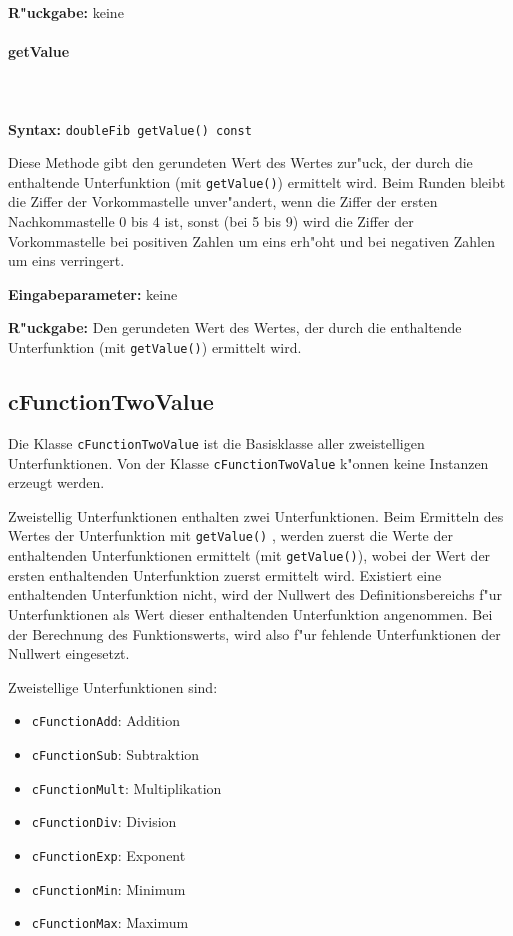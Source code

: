 \bigskip\noindent
\textbf{R"uckgabe:} keine


\paragraph{getValue}

\ \\\\\noindent
\textbf{Syntax:} \verb|doubleFib getValue() const|

\bigskip\noindent
Diese Methode gibt den gerundeten Wert des Wertes zur"uck, der durch die enthaltende Unterfunktion (mit \verb|getValue()|) ermittelt wird. Beim Runden bleibt die Ziffer der Vorkommastelle unver"andert, wenn die Ziffer der ersten Nachkommastelle 0 bis 4 ist, sonst (bei 5 bis 9) wird die Ziffer der Vorkommastelle bei positiven Zahlen um eins erh"oht und bei negativen Zahlen um eins verringert.

\bigskip\noindent
\textbf{Eingabeparameter:} keine

\bigskip\noindent
\textbf{R"uckgabe:} Den gerundeten Wert des Wertes, der durch die enthaltende Unterfunktion (mit \verb|getValue()|) ermittelt wird.




\subsection{cFunctionTwoValue}

Die Klasse \verb|cFunctionTwoValue| ist die Basisklasse aller zweistelligen Unterfunktionen. Von der Klasse \verb|cFunctionTwoValue| k"onnen keine Instanzen erzeugt werden.

Zweistellig Unterfunktionen enthalten zwei Unterfunktionen. Beim Ermitteln des Wertes der Unterfunktion mit \verb|getValue()| , werden zuerst die Werte der enthaltenden Unterfunktionen ermittelt (mit \verb|getValue()|), wobei der Wert der ersten enthaltenden Unterfunktion zuerst ermittelt wird. Existiert eine enthaltenden Unterfunktion nicht, wird der Nullwert des Definitionsbereichs f"ur Unterfunktionen als Wert dieser enthaltenden Unterfunktion angenommen. Bei der Berechnung des Funktionswerts, wird also f"ur fehlende Unterfunktionen der Nullwert eingesetzt.

\bigskip\noindent
Zweistellige Unterfunktionen sind:
\begin{itemize}
 \item \verb|cFunctionAdd|: Addition
 \item \verb|cFunctionSub|: Subtraktion
 \item \verb|cFunctionMult|: Multiplikation
 \item \verb|cFunctionDiv|: Division
 \item \verb|cFunctionExp|: Exponent
 \item \verb|cFunctionMin|: Minimum
 \item \verb|cFunctionMax|: Maximum
\end{itemize}

